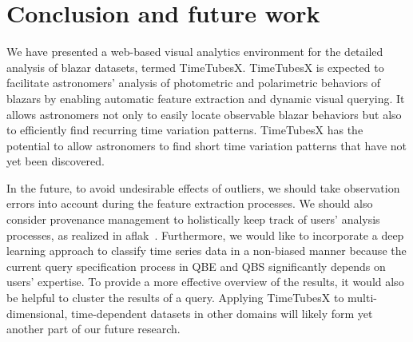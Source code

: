 \section{Conclusion and future work\label{sec:conclusion}}
We have presented a web-based visual analytics environment for the detailed analysis of blazar datasets, termed TimeTubesX. 
TimeTubesX is expected to facilitate astronomers’ analysis of photometric and polarimetric behaviors of blazars 
by enabling automatic feature extraction and dynamic visual querying.
It allows astronomers not only to easily locate observable blazar behaviors but also to efficiently find recurring time variation patterns.
TimeTubesX has the potential to allow astronomers to find short time variation patterns that have not yet been discovered.

In the future, 
to avoid undesirable effects of outliers,
we should take observation errors into account during the feature extraction processes. 
We should also consider provenance management to holistically keep track of users’ analysis processes, as realized in aflak~\cite{Boussejra2019}.
Furthermore, we would like to incorporate a deep learning approach to classify time series data in a non-biased manner because the current query specification process in QBE and QBS significantly depends on users' expertise.
To provide a more effective overview of the results, it would also be helpful to cluster the results of a query. 
Applying TimeTubesX to multi-dimensional, time-dependent datasets in other domains will likely form yet another part of our future research.